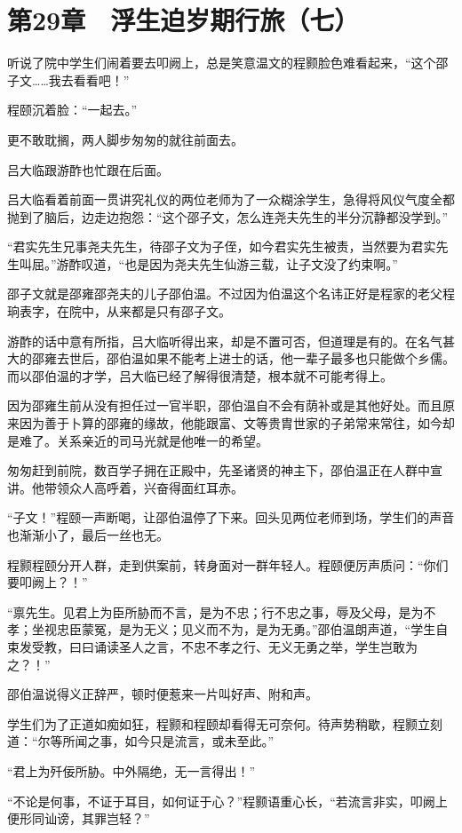 \section{第29章　浮生迫岁期行旅（七）}

听说了院中学生们闹着要去叩阙上，总是笑意温文的程颢脸色难看起来，“这个邵子文……我去看看吧！”

程颐沉着脸：“一起去。”

更不敢耽搁，两人脚步匆匆的就往前面去。

吕大临跟游酢也忙跟在后面。

吕大临看着前面一贯讲究礼仪的两位老师为了一众糊涂学生，急得将风仪气度全都抛到了脑后，边走边抱怨：“这个邵子文，怎么连尧夫先生的半分沉静都没学到。”

“君实先生兄事尧夫先生，待邵子文为子侄，如今君实先生被责，当然要为君实先生叫屈。”游酢叹道，“也是因为尧夫先生仙游三载，让子文没了约束啊。”

邵子文就是邵雍邵尧夫的儿子邵伯温。不过因为伯温这个名讳正好是程家的老父程珦表字，在院中，从来都是只有邵子文。

游酢的话中意有所指，吕大临听得出来，却是不置可否，但道理是有的。在名气甚大的邵雍去世后，邵伯温如果不能考上进士的话，他一辈子最多也只能做个乡儒。而以邵伯温的才学，吕大临已经了解得很清楚，根本就不可能考得上。

因为邵雍生前从没有担任过一官半职，邵伯温自不会有荫补或是其他好处。而且原来因为善于卜算的邵雍的缘故，他能跟富、文等贵胄世家的子弟常来常往，如今却是难了。关系亲近的司马光就是他唯一的希望。

匆匆赶到前院，数百学子拥在正殿中，先圣诸贤的神主下，邵伯温正在人群中宣讲。他带领众人高呼着，兴奋得面红耳赤。

“子文！”程颐一声断喝，让邵伯温停了下来。回头见两位老师到场，学生们的声音也渐渐小了，最后一丝也无。

程颢程颐分开人群，走到供案前，转身面对一群年轻人。程颐便厉声质问：“你们要叩阙上？！”

“禀先生。见君上为臣所胁而不言，是为不忠；行不忠之事，辱及父母，是为不孝；坐视忠臣蒙冤，是为无义；见义而不为，是为无勇。”邵伯温朗声道，“学生自束发受教，曰曰诵读圣人之言，不忠不孝之行、无义无勇之举，学生岂敢为之？！”

邵伯温说得义正辞严，顿时便惹来一片叫好声、附和声。

学生们为了正道如痴如狂，程颢和程颐却看得无可奈何。待声势稍歇，程颢立刻道：“尔等所闻之事，如今只是流言，或未至此。”

“君上为歼佞所胁。中外隔绝，无一言得出！”

“不论是何事，不证于耳目，如何证于心？”程颢语重心长，“若流言非实，叩阙上便形同讪谤，其罪岂轻？”

